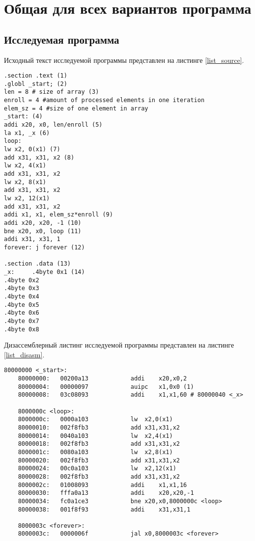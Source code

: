 \chapter*{Общая для всех вариантов программа}

\section*{Исследуемая программа}

Исходный текст исследуемой программы  представлен на листинге \ref{list_source}.

\begin{lstlisting}[caption=Исходный текст исследуемой программы,
	label={list_source}]
.section .text (1)
.globl _start; (2)
len = 8 # size of array (3)
enroll = 4 #amount of processed elements in one iteration
elem_sz = 4 #size of one element in array
_start: (4)
addi x20, x0, len/enroll (5)
la x1, _x (6)
loop:
lw x2, 0(x1) (7)
add x31, x31, x2 (8)
lw x2, 4(x1)
add x31, x31, x2
lw x2, 8(x1)
add x31, x31, x2
lw x2, 12(x1)
add x31, x31, x2
addi x1, x1, elem_sz*enroll (9)
addi x20, x20, -1 (10)
bne x20, x0, loop (11)
addi x31, x31, 1
forever: j forever (12)

.section .data (13)
_x:     .4byte 0x1 (14)
.4byte 0x2
.4byte 0x3
.4byte 0x4
.4byte 0x5
.4byte 0x6
.4byte 0x7
.4byte 0x8
\end{lstlisting}

\clearpage
Дизассемблерный листинг исследуемой программы  представлен на листинге \ref{list_disasm}.


\begin{lstlisting}[caption=Дизассемблерный листинг исследуемой программы,
	label={list_disasm}]
	80000000 <_start>:
	80000000:	00200a13          	addi	x20,x0,2
	80000004:	00000097          	auipc	x1,0x0 (1)
	80000008:	03c08093          	addi	x1,x1,60 # 80000040 <_x>
	
	8000000c <loop>:
	8000000c:	0000a103          	lw	x2,0(x1)
	80000010:	002f8fb3          	add	x31,x31,x2
	80000014:	0040a103          	lw	x2,4(x1)
	80000018:	002f8fb3          	add	x31,x31,x2
	8000001c:	0080a103          	lw	x2,8(x1)
	80000020:	002f8fb3          	add	x31,x31,x2
	80000024:	00c0a103          	lw	x2,12(x1)
	80000028:	002f8fb3          	add	x31,x31,x2
	8000002c:	01008093          	addi	x1,x1,16
	80000030:	fffa0a13          	addi	x20,x20,-1
	80000034:	fc0a1ce3          	bne	x20,x0,8000000c <loop>
	80000038:	001f8f93          	addi	x31,x31,1
	
	8000003c <forever>:
	8000003c:	0000006f          	jal	x0,8000003c <forever>
\end{lstlisting}

